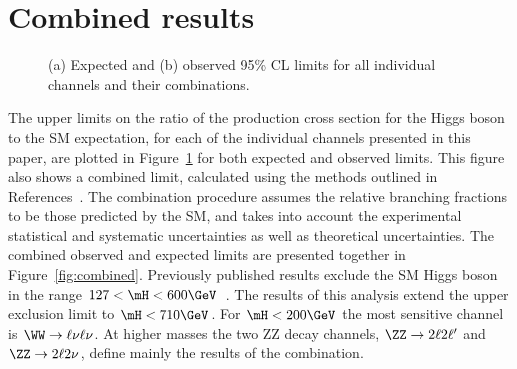 
%
\section{Combined results}
\label{sec:results}

\begin{figure}[htbp`]
  \centering
{}
  \caption{\label{fig:AllLimits} (a) Expected and  (b) observed 95\% CL limits
  for all individual channels and their combinations.}
\end{figure}

The upper limits on the ratio of the production cross section for the Higgs boson to the SM expectation, for each of the individual channels presented in this paper, are plotted in Figure~\ref{fig:AllLimits} for both expected and
observed limits. This figure also shows a combined limit, calculated using the methods outlined in References~\cite{LHC-HCG-Report, CMScombFeb2012}. The combination procedure assumes the relative branching fractions to be those predicted by the SM, and takes into account the experimental statistical and systematic uncertainties as well as theoretical uncertainties. The combined observed and expected limits are presented together in Figure~\ref{fig:combined}. 
Previously published results exclude the SM Higgs boson in the range $127 < \mH <  600\GeV$~\cite{Chatrchyan:2012tx}. The results of this analysis extend the upper exclusion limit to $\mH < 710\GeV$. For $\mH < 200\GeV$ the most sensitive channel is $\WW \to \ell\nu\ell\nu$. At higher masses the two ZZ decay channels, $\ZZ \to 2\ell 2\ell'$ and $\ZZ \to 2\ell 2\nu$,
define mainly the results of the combination. 

